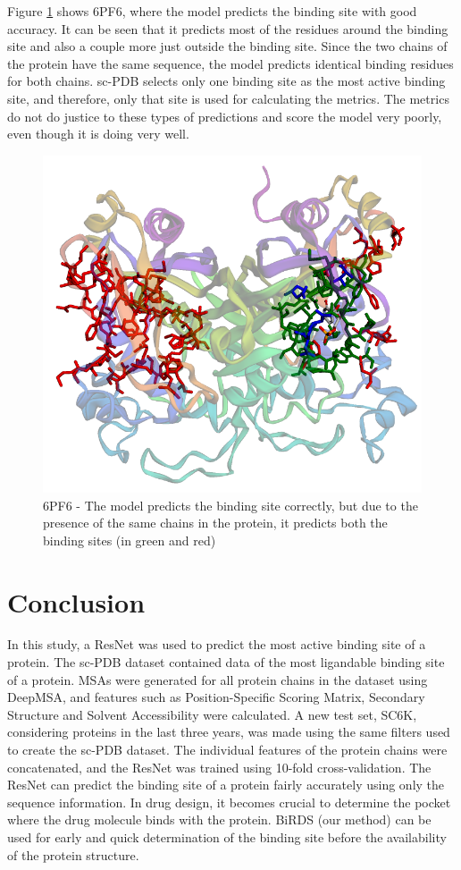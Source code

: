 \documentclass[journal=jacsat,manuscript=article]{achemso}
\begin{document}
Figure \ref{fig:6pf6} shows 6PF6\cite{czyzyk2019structure}, where the model predicts the binding site with good accuracy. It can be seen that it predicts most of the residues around the binding site and also a couple more just outside the binding site. Since the two chains of the protein have the same sequence, the model predicts identical binding residues for both chains. sc-PDB selects only one binding site as the most active binding site, and therefore, only that site is used for calculating the metrics. The metrics do not do justice to these types of predictions and score the model very poorly, even though it is doing very well.
\begin{figure}
    \centering
    \noindent\includegraphics[scale=0.4]{6pf6.png}
    \caption{\centering 6PF6 - The model predicts the binding site correctly, but due to the presence of the same chains in the protein, it predicts both the binding sites (in green and red)}
    \label{fig:6pf6}
\end{figure}

\newpage
\section{Conclusion}
In this study, a ResNet was used to predict the most active binding site of a protein. The sc-PDB\cite{desaphy2015sc} dataset contained data of the most ligandable binding site of a protein. MSAs were generated for all protein chains in the dataset using DeepMSA, and features such as Position-Specific Scoring Matrix, Secondary Structure and Solvent Accessibility were calculated. A new test set, SC6K, considering proteins in the last three years, was made using the same filters used to create the sc-PDB dataset. The individual features of the protein chains were concatenated, and the ResNet was trained using 10-fold cross-validation. The ResNet can predict the binding site of a protein fairly accurately using only the sequence information. In drug design, it becomes crucial to determine the pocket where the drug molecule binds with the protein. BiRDS (our method) can be used for early and quick determination of the binding site before the availability of the protein structure.
\end{document}
